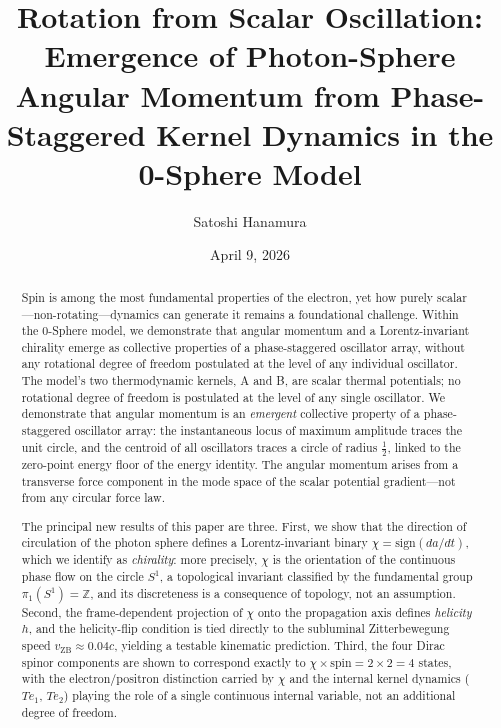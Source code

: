 \documentclass[%
 reprint, amsmath,amssymb, aps, prb, ]{revtex4-2}
\numberwithin{equation}{section}
\begin{document}
\title{Rotation from Scalar Oscillation: Emergence of Photon-Sphere Angular Momentum from Phase-Staggered Kernel Dynamics in the 0-Sphere Model}

\author{Satoshi Hanamura}
\date{April 9, 2026}

\begin{abstract}
Spin is among the most fundamental properties of the electron, yet how purely scalar—non-rotating—dynamics can generate it remains a foundational challenge. Within the 0-Sphere model, we demonstrate that angular momentum and a Lorentz-invariant chirality emerge as collective properties of a phase-staggered oscillator array, without any rotational degree of freedom postulated at the level of any individual oscillator.
The model's two thermodynamic kernels, A and B, are scalar thermal potentials; no rotational degree of freedom is postulated at the level of any single oscillator.
We demonstrate that angular momentum is an \emph{emergent} collective property of a phase-staggered oscillator array: the instantaneous locus of maximum amplitude traces the unit circle, and the centroid of all oscillators traces a circle of radius $\tfrac{1}{2}$, linked to the zero-point energy floor of the energy identity.
The angular momentum arises from a transverse force component in the mode space of the scalar potential gradient---not from any circular force law.

The principal new results of this paper are three.
First, we show that the direction of circulation of the photon sphere defines a Lorentz-invariant binary $\chi = \mathrm{sign}(da/dt)$, which we identify as \emph{chirality}: more precisely, $\chi$ is the orientation of the continuous phase flow on the circle $S^1$, a topological invariant classified by the fundamental group $\pi_1(S^1) = \mathbb{Z}$, and its discreteness is a consequence of topology, not an assumption.
Second, the frame-dependent projection of $\chi$ onto the propagation axis defines \emph{helicity} $h$, and the helicity-flip condition is tied directly to the subluminal Zitterbewegung speed $v_\mathrm{ZB} \approx 0.04c$, yielding a testable kinematic prediction.
Third, the four Dirac spinor components are shown to correspond exactly to $\chi \times \mathrm{spin} = 2 \times 2 = 4$ states, with the electron/positron distinction carried by $\chi$ and the internal kernel dynamics ($Te_1$, $Te_2$) playing the role of a single continuous internal variable, not an additional degree of freedom.


\end{abstract}
\end{document}

